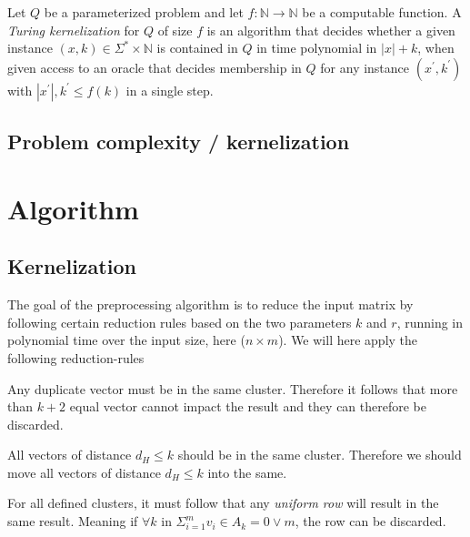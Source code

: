 \documentclass[a4paper]{article}
\begin{document}
\begin{theoremdefinition}
    Let $Q$ be a parameterized problem and let $f:\mathbb{N} \rightarrow \mathbb{N} $
    be a computable function. A \textit{Turing kernelization} for $Q$ of size $f$ is an
    algorithm that decides whether a given instance $(x,k) \in \Sigma^* \times \mathbb{N}$
    is contained in $Q$ in time polynomial in $|x|+k$, when given access to an oracle
    that decides membership in $Q$ for any instance $(x^\prime, k^\prime)$ with
    $|x^\prime|,k^\prime \leq f(k)$ in a single step. \cite[p.~314]{param_algo_book}
\end{theoremdefinition}

\subsection{Problem complexity / kernelization}

%
%
\newpage

\section{Algorithm}
\subsection{Kernelization}
The goal of the preprocessing algorithm is to reduce the input matrix by following certain reduction rules
based on the two parameters $k$ and $r$, running in polynomial time over the input size, here ($n \times m$).
We will here apply the following reduction-rules 
\begin{reductionrule}\label{red:equalclusters}
    Any duplicate vector must be in the same cluster. Therefore it follows that more than $k+2$ equal vector
    cannot impact the result and they can therefore be discarded.
\end{reductionrule}

\begin{reductionrule}\label{red:distmaxk}
    All vectors of distance $d_H \leq k$ should be in the same cluster. Therefore we should move all vectors of
    distance $d_H \leq k$ into the same.
\end{reductionrule}

\begin{reductionrule}\label{red:uniformrow}
    For all defined clusters, it must follow that any \textit{uniform row} will result in the same result. Meaning 
    if $\forall k$ in $\Sigma_{i=1}^{m} v_i \in A_k = 0 \vee m$, the row can be discarded.
\end{reductionrule}
\end{document}
